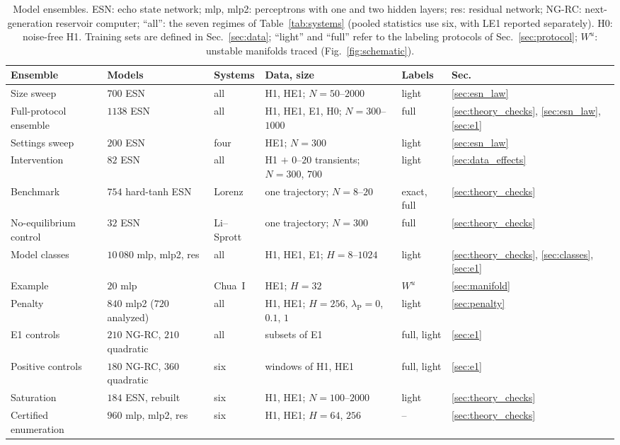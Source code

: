 \documentclass[aip,cha,reprint,amsmath,amssymb,longbibliography]{revtex4-2}
\theoremstyle{definition}
\begin{document}
\begin{table}
\caption{Model ensembles. ESN: echo state network; mlp, mlp2: perceptrons with one and two hidden layers; res: residual
network; NG-RC: next-generation reservoir computer; ``all'': the seven regimes of Table~\ref{tab:systems} (pooled statistics use six, with LE1 reported separately). H0: noise-free H1. Training sets
are defined in Sec.~\ref{sec:data}; ``light'' and ``full'' refer to the labeling protocols of Sec.~\ref{sec:protocol}; $W^u$: unstable manifolds traced
(Fig.~\ref{fig:schematic}).}
\label{tab:ensembles}
\begin{ruledtabular}
\begin{tabular}{llllll}
Ensemble & Models & Systems & Data, size & Labels & Sec. \\
\hline
Size sweep & $700$ ESN & all & H1, HE1; $N=50$--$2000$ & light & \ref{sec:esn_law} \\
Full-protocol ensemble & $1138$ ESN & all & H1, HE1, E1, H0; $N=300$--$1000$ & full & \ref{sec:theory_checks}, \ref{sec:esn_law}, \ref{sec:e1} \\
Settings sweep & $200$ ESN & four & HE1; $N=300$ & light & \ref{sec:esn_law} \\
Intervention & $82$ ESN & all & H1 $+$ $0$--$20$ transients; $N=300$, $700$ & light & \ref{sec:data_effects} \\
Benchmark & $754$ hard-tanh ESN & Lorenz & one trajectory; $N=8$--$20$ & exact, full & \ref{sec:theory_checks} \\
No-equilibrium control & $32$ ESN & Li--Sprott & one trajectory; $N=300$ & full & \ref{sec:theory_checks} \\
Model classes & $10\,080$ mlp, mlp2, res & all & H1, HE1, E1; $H=8$--$1024$ & light & \ref{sec:theory_checks}, \ref{sec:classes}, \ref{sec:e1} \\
Example & $20$ mlp & Chua~I & HE1; $H=32$ & $W^u$ & \ref{sec:manifold} \\
Penalty & $840$ mlp2 ($720$ analyzed) & all & H1, HE1; $H=256$, $\lambda_{\mathrm{P}}=0$, $0.1$, $1$ & light & \ref{sec:penalty} \\
E1 controls & $210$ NG-RC, $210$ quadratic & all & subsets of E1 & full, light & \ref{sec:e1} \\
Positive controls & $180$ NG-RC, $360$ quadratic & six & windows of H1, HE1 & full, light & \ref{sec:e1} \\
Saturation & $184$ ESN, rebuilt & six & H1, HE1; $N=100$--$2000$ & light & \ref{sec:theory_checks} \\
Certified enumeration & $960$ mlp, mlp2, res & six & H1, HE1; $H=64$, $256$ & -- & \ref{sec:theory_checks} \\
\end{tabular}
\end{ruledtabular}
\end{table}
\end{document}
